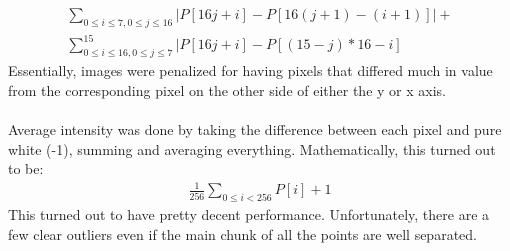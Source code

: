 \documentclass[12pt]{article}
\begin{document}
\begin{gather*}
\sum_{0 \le i \le 7, 0 \le j \le 16}|P[16j + i] - P[16(j + 1) - (i + 1)]| + 
\\ \sum_{0 \le i \le 16, 0 \le j \le 7}^{15}|P[16j + i] - P[(15 - j)*16 - i]
\end{gather*}
Essentially, images were penalized for having pixels that differed much in value from the corresponding pixel on the other side of either the y or x axis.
\\ \\ Average intensity was done by taking the difference between each pixel and pure white (-1), summing and averaging everything. Mathematically, this turned out to be:
\begin{gather*}
\frac{1}{256}\sum_{0 \le i < 256}P[i] + 1
\end{gather*}
This turned out to have pretty decent performance. Unfortunately, there are a few clear outliers even if the main chunk of all the points are well separated.
\end{document}
